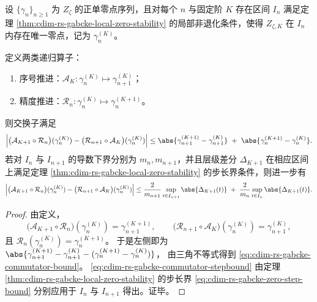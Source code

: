 \begin{proposition}[序号推进与精度推进的近似可交换性]\label{prop:cdim-rs-gabcke-recursions-almost-commute}
设 \(\{\gamma_n\}_{n\ge 1}\) 为 \(Z_{\zeta}\) 的正单零点序列，且对每个 \(n\) 与固定阶 \(K\) 存在区间 \(I_n\) 满足定理 \ref{thm:cdim-rs-gabcke-local-zero-stability} 的局部非退化条件，使得 \(Z_{\zeta,K}\) 在 \(I_n\) 内存在唯一零点，记为 \(\gamma_n^{(K)}\)。
\par
定义两类递归算子：
\begin{enumerate}
  \item 序号推进：\(\mathcal A_K:\gamma_n^{(K)}\mapsto \gamma_{n+1}^{(K)}\)；
  \item 精度推进：\(\mathcal R_n:\gamma_n^{(K)}\mapsto \gamma_n^{(K+1)}\)。
\end{enumerate}
则交换子满足
\begin{equation}\label{eq:cdim-rs-gabcke-commutator-bound}
\Bigl|
\bigl(\mathcal A_{K+1}\circ\mathcal R_n\bigr)(\gamma_n^{(K)})
-\bigl(\mathcal R_{n+1}\circ\mathcal A_K\bigr)(\gamma_n^{(K)})
\Bigr|
\le
\abs{\gamma_{n+1}^{(K+1)}-\gamma_{n+1}^{(K)}}
\;+\;
\abs{\gamma_{n}^{(K+1)}-\gamma_{n}^{(K)}}.
\end{equation}
若对 \(I_n\) 与 \(I_{n+1}\) 的导数下界分别为 \(m_n,m_{n+1}\)，并且层级差分 \(\Delta_{K+1}\) 在相应区间上满足定理 \ref{thm:cdim-rs-gabcke-local-zero-stability} 的步长界条件，则进一步有
\begin{equation}\label{eq:cdim-rs-gabcke-commutator-stepbound}
\Bigl|
\bigl(\mathcal A_{K+1}\circ\mathcal R_n\bigr)(\gamma_n^{(K)})
-\bigl(\mathcal R_{n+1}\circ\mathcal A_K\bigr)(\gamma_n^{(K)})
\Bigr|
\le
\frac{2}{m_{n+1}}\sup_{t\in I_{n+1}}\abs{\Delta_{K+1}(t)}
\;+\;
\frac{2}{m_{n}}\sup_{t\in I_{n}}\abs{\Delta_{K+1}(t)}.
\end{equation}
\end{proposition}
\begin{proof}
由定义，
\[
\bigl(\mathcal A_{K+1}\circ\mathcal R_n\bigr)(\gamma_n^{(K)})=\gamma_{n+1}^{(K+1)},
\qquad
\bigl(\mathcal R_{n+1}\circ\mathcal A_K\bigr)(\gamma_n^{(K)})=\gamma_{n+1}^{(K)},
\]
且 \(\mathcal R_n(\gamma_n^{(K)})=\gamma_n^{(K+1)}\)。
于是左侧即为
\(
\abs{\gamma_{n+1}^{(K+1)}-\gamma_{n+1}^{(K)}-(\gamma_n^{(K+1)}-\gamma_n^{(K)})}
\)，
由三角不等式得到 \eqref{eq:cdim-rs-gabcke-commutator-bound}。
\eqref{eq:cdim-rs-gabcke-commutator-stepbound} 由定理 \ref{thm:cdim-rs-gabcke-local-zero-stability} 的步长界 \eqref{eq:cdim-rs-gabcke-zero-step-bound} 分别应用于 \(I_n\) 与 \(I_{n+1}\) 得出。证毕。
\end{proof}

